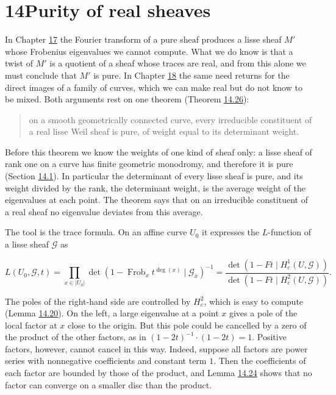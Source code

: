 \documentclass[11pt]{article}
\begin{document}
\section*{\texorpdfstring{14\quad Purity of real sheaves}{14 Purity of real sheaves}}
\label{bp39}%
\label{bp40}%
In Chapter \hyperref[bp223]{17} the Fourier transform of a pure sheaf produces a lisse sheaf \(M'\) whose Frobenius eigenvalues we cannot compute. What we do know is that a twist of \(M'\) is a quotient of a sheaf whose traces are real, and from this alone we must conclude that \(M'\) is pure. In Chapter \hyperref[bp271]{18} the same need returns for the direct images of a family of curves, which we can make real but do not know to be mixed. Both arguments rest on one theorem (Theorem \hyperref[bp120]{14.26}):

\begin{quote}
on a smooth geometrically connected curve, every irreducible constituent of a real lisse Weil sheaf is pure, of weight equal to its determinant weight.
\end{quote}

Before this theorem we know the weights of one kind of sheaf only: a lisse sheaf of rank one on a curve has finite geometric monodromy, and therefore it is pure (Section \hyperref[bp41]{14.1}). In particular the determinant of every lisse sheaf is pure, and its weight divided by the rank, the determinant weight, is the average weight of the eigenvalues at each point. The theorem says that on an irreducible constituent of a real sheaf no eigenvalue deviates from this average.

The tool is the trace formula. On an affine curve \(U_0\) it expresses the \(L\)-function of a lisse sheaf \(\mathcal G\) as

\[
L(U_0,\mathcal G,t)
=\prod_{x\in|U_0|}\det(1-\operatorname{Frob}_xt^{\deg(x)}\mid\mathcal G_{\bar x})^{-1}
=\frac{\det(1-Ft\mid H^1_c(U,\mathcal G))}{\det(1-Ft\mid H^2_c(U,\mathcal G))}.
\]

The poles of the right-hand side are controlled by \(H^2_c\), which is easy to compute (Lemma \hyperref[bp104]{14.20}). On the left, a large eigenvalue at a point \(x\) gives a pole of the local factor at \(x\) close to the origin. But this pole could be cancelled by a zero of the product of the other factors, as in \((1-2t)^{-1}\cdot(1-2t)=1\). Positive factors, however, cannot cancel in this way. Indeed, suppose all factors are power series with nonnegative coefficients and constant term \(1\). Then the coefficients of each factor are bounded by those of the product, and Lemma \hyperref[bp113]{14.24} shows that no factor can converge on a smaller disc than the product.
\end{document}
